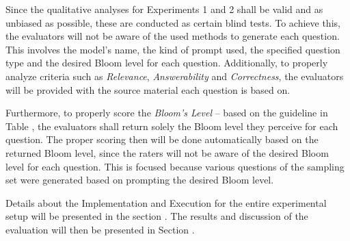 \pagebreak

Since the qualitative analyses for Experiments 1 and 2 shall be valid and as unbiased as possible, these are conducted as certain blind tests. To achieve this, the evaluators will not be aware of the used methods to generate each question. This involves the model's name, the kind of prompt used, the specified question type and the desired Bloom level for each question. Additionally, to properly analyze criteria such as \textit{Relevance}, \textit{Answerability} and \textit{Correctness}, the evaluators will be provided with the source material each question is based on. 

Furthermore, to properly score the \textit{Bloom's Level} -- based on the guideline in Table , the evaluators shall return solely the Bloom level they perceive for each question. The proper scoring then will be done automatically based on the returned Bloom level, since the raters will not be aware of the desired Bloom level for each question. This is focused because various questions of the sampling set were generated based on prompting the desired Bloom level.

Details about the Implementation and Execution for the entire experimental setup will be presented in the section . The results and discussion of the evaluation will then be presented in Section .
